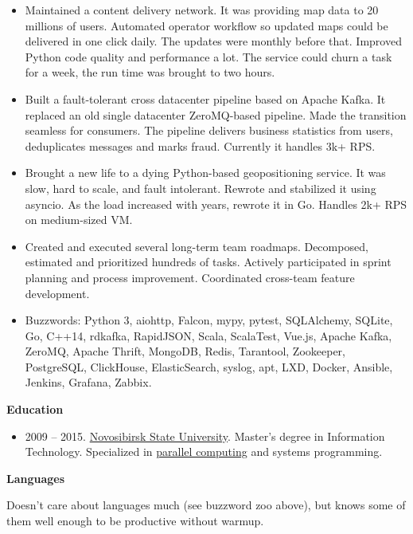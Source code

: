 \documentclass[final]{letter}
\begin{document}
\begin{itemize}
  \begin{itemize}
    \item Maintained a content delivery network. It was providing map data to 20 millions of users.
      Automated operator workflow so updated maps could be delivered in one click daily.
      The updates were monthly before that.
      Improved Python code quality and performance a lot.
       The service could churn a task for a week, the run time was brought to two hours.
    \item Built a fault-tolerant cross datacenter pipeline based on Apache Kafka.
      It replaced an old single datacenter ZeroMQ-based pipeline.
      Made the transition seamless for consumers. The pipeline delivers business statistics from users,
      deduplicates messages and marks fraud. Currently it handles 3k+ RPS.
    \item Brought a new life to a dying Python-based geopositioning service.
    It was slow, hard to scale, and fault intolerant.
      Rewrote and stabilized it using asyncio.
      As the load increased with years, rewrote it in Go.
      Handles 2k+ RPS on medium-sized VM.
    \item Created and executed several long-term team roadmaps.
     Decomposed, estimated and prioritized hundreds of tasks.
    Actively participated in sprint planning and process improvement.
    Coordinated cross-team feature development.
    \item Buzzwords: Python 3, aiohttp, Falcon, mypy, pytest, SQLAlchemy, SQLite, Go, C++14, rdkafka, RapidJSON,
     Scala, ScalaTest, Vue.js, Apache Kafka, ZeroMQ, Apache Thrift,
     MongoDB, Redis, Tarantool, Zookeeper, PostgreSQL, ClickHouse, ElasticSearch, syslog, apt, LXD, Docker, Ansible, Jenkins, Grafana, Zabbix.
  \end{itemize}

  \end{itemize}

{\bf Education}
\begin{itemize}
  \item 2009 -- 2015. \href{https://www.nsu.ru/n/}{Novosibirsk State University}.
  Master's degree in Information Technology.
  Specialized in \href{http://ssd.sscc.ru/en/info}{parallel computing} and systems programming.
\end{itemize}

\newpage

{\bf Languages}

Doesn't care about languages much (see buzzword zoo above), but knows some of them well enough to be productive without warmup.
\end{document}
